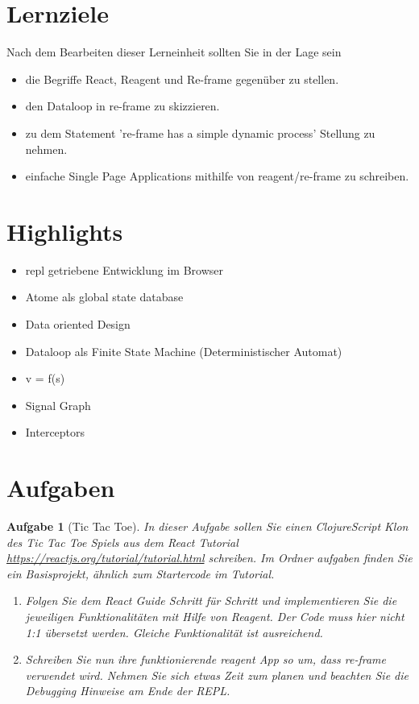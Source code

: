 \documentclass[11pt,a4paper]{article}
\newcounter{numb}
\theoremstyle{break}
\newtheorem{aufgabe}{Aufgabe}[numb]
\begin{document}
\section{Lernziele}

Nach dem Bearbeiten dieser Lerneinheit sollten Sie in der Lage sein

\begin{itemize}
    \item die Begriffe React, Reagent und Re-frame gegenüber zu stellen.
    \item den Dataloop in re-frame zu skizzieren.
    \item zu dem Statement 're-frame has a simple dynamic process' Stellung zu nehmen.
    \item einfache Single Page Applications mithilfe von reagent/re-frame zu schreiben.
\end{itemize}

\section{Highlights}

\begin{itemize}
    \item repl getriebene Entwicklung im Browser
    \item Atome als global state database
    \item Data oriented Design
    \item Dataloop als Finite State Machine (Deterministischer Automat)
    \item v = f(s)
    \item Signal Graph
    \item Interceptors
\end{itemize}

\section{Aufgaben}

\begin{aufgabe}[Tic Tac Toe]

In dieser Aufgabe sollen Sie einen ClojureScript Klon des Tic Tac Toe Spiels aus dem React Tutorial \url{https://reactjs.org/tutorial/tutorial.html} schreiben.
Im Ordner aufgaben finden Sie ein Basisprojekt, ähnlich zum Startercode im Tutorial.

\begin{enumerate}[label=\alph*)]
  \item Folgen Sie dem React Guide Schritt für Schritt und implementieren Sie die jeweiligen Funktionalitäten mit Hilfe von Reagent.
        Der Code muss hier nicht 1:1 übersetzt werden. Gleiche Funktionalität ist ausreichend.
  \item Schreiben Sie nun ihre funktionierende reagent App so um, dass re-frame verwendet wird.
        Nehmen Sie sich etwas Zeit zum planen und beachten Sie die Debugging Hinweise am Ende der REPL.
\end{enumerate}

\end{aufgabe}
\end{document}
